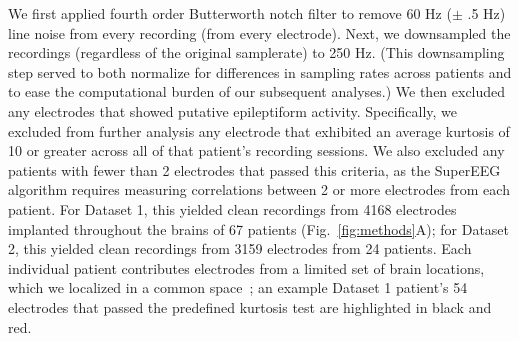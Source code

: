 \documentclass[11pt]{article}
\begin{document}
We first applied fourth order Butterworth notch filter to remove 60 Hz
($\pm$ .5 Hz) line noise from every recording (from every electrode).
Next, we downsampled the recordings (regardless of the original
samplerate) to 250 Hz.  (This downsampling step served to both
normalize for differences in sampling rates across patients and to
ease the computational burden of our subsequent analyses.)  We then
excluded any electrodes that showed putative epileptiform activity.
Specifically, we excluded from further analysis any electrode that
exhibited an average kurtosis of 10 or greater across all of that
patient's recording sessions.  We also excluded any patients with
fewer than 2 electrodes that passed this criteria, as the SuperEEG
algorithm requires measuring correlations between 2 or more electrodes
from each patient.  For Dataset 1, this yielded clean recordings from
4168 electrodes implanted throughout the brains of 67 patients
(Fig.~\ref{fig:methods}A); for Dataset 2, this yielded clean
recordings from 3159 electrodes from 24 patients.  Each individual
patient contributes electrodes from a limited set of brain locations,
which we localized in a common space~\citep[MNI152;][]{GrabEtal06}; an
example Dataset 1 patient's 54 electrodes that passed the predefined
kurtosis test are highlighted in black and red.
\end{document}
